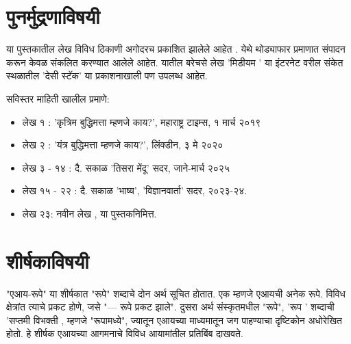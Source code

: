 \chapter*{पुनर्मुद्रणाविषयी}

या पुस्तकातील लेख विविध ठिकाणी अगोदरच प्रकाशित झालेले आहेत .  येथे थोड्याफार प्रमाणात संपादन करून केवळ संकलित करण्यात आलेले आहेत.  यातील बरेचसे लेख 'मिडीयम '  या इंटरनेट वरील संकेत स्थळातील 'देसी स्टॅक' या प्रकाशनाखाली पण उपलब्ध आहेत. 

\vspace{1.5em}
सविस्तर माहिती खालील प्रमाणे:

\begin{itemize}
	\item लेख १ : 'कृत्रिम बुद्धिमत्ता म्हणजे काय?', महाराष्ट्र टाइम्स, १  मार्च २०१९
	\item  लेख २ :  'यंत्र बुद्धिमत्ता म्हणजे काय?',  लिंक्डीन, ३ मे २०२०  
	\item  लेख ३ - १४ : दै. सकाळ  'तिसरा मेंदू' सदर, जाने-मार्च २०२५
	\item  लेख १५ - २२ : दै. सकाळ 'भाष्य', 'विज्ञानवार्ता'  सदर, २०२३-२४. 
	\item  लेख २३:   नवीन लेख ,  या पुस्तकनिमित्त. 
\end{itemize}


\chapter*{शीर्षकाविषयी }

"एआय-रूपे" या शीर्षकात "रूपे" शब्दाचे दोन अर्थ सूचित होतात. एक म्हणजे एआयची अनेक रूपे. विविध क्षेत्रांत त्याचे प्रकट होणे, जसे "--- रूपे प्रकट झाले". दुसरा अर्थ संस्कृतमधील "रूपे", 'रूप '  शब्दाची 'सप्तमी विभक्ती , म्हणजे "रूपामध्ये", ज्यातून एआयच्या माध्यमातून जग पाहण्याचा दृष्टिकोन अधोरेखित होतो. हे शीर्षक एआयच्या आगमनाचे विविध आयामांतील प्रतिबिंब दाखवते.